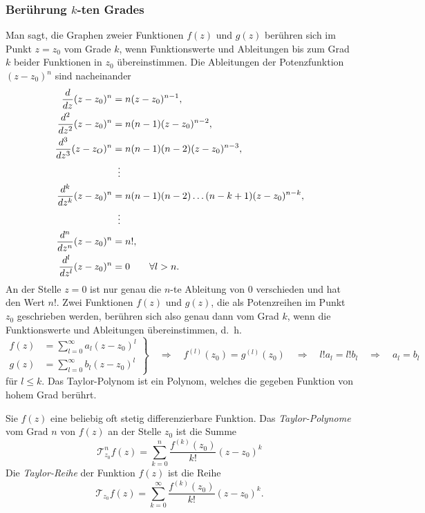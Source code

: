 %
%
\subsubsection{Berührung $k$-ten Grades}
Man sagt, die Graphen zweier Funktionen $f(z)$ und $g(z)$ berühren
sich im Punkt $z=z_0$ vom Grade $k$, wenn Funktionswerte und
Ableitungen bis zum Grad $k$ beider Funktionen in $z_0$ übereinstimmen.
Die Ableitungen der Potenzfunktion $(z-z_0)^n$ sind nacheinander
\begin{align*}
\frac{d}{dz}(z-z_0)^n&= n(z-z_0)^{n-1},
\\
\frac{d^2}{dz^2}(z-z_0)^n&=n(n-1)(z-z_0)^{n-2},
\\
\frac{d^3}{dz^3}(z-z_O)^n&=n(n-1)(n-2)(z-z_0)^{n-3},
\\
&\hspace*{2mm}\vdots
\\
\frac{d^k}{dz^k}(z-z_0)^n&=n(n-1)(n-2)\dots(n-k+1)(z-z_0)^{n-k},
\\
&\hspace*{2mm}\vdots
\\
\frac{d^n}{dz^n}(z-z_0)^n&=n!,
\\
\frac{d^l}{dz^l}(z-z_0)^n&=0\qquad\forall l>n.
\end{align*}
An der Stelle $z=0$ ist nur genau die $n$-te Ableitung von $0$ verschieden
und hat den Wert $n!$.
Zwei Funktionen $f(z)$ und $g(z)$, die als Potenzreihen im Punkt $z_0$
geschrieben werden, berühren sich also genau dann vom Grad $k$, wenn
die Funktionswerte und Ableitungen übereinstimmen, d.~h.
\begin{equation}
\left.
\begin{aligned}
f(z)&=\sum_{l=0}^\infty a_l(z-z_0)^l \\
g(z)&=\sum_{l=0}^\infty b_l(z-z_0)^l 
\end{aligned}
\right\}
\quad\Rightarrow\quad
f^{(l)}(z_0) = g^{(l)}(z_0)
\quad\Rightarrow\quad
l!a_l = l!b_l
\quad\Rightarrow\quad
a_l=b_l
\end{equation}
für $l\le k$.
Das Taylor-Polynom ist ein Polynom, welches die gegeben Funktion
von hohem Grad berührt.

\begin{definition}
\label{buch:polynome:definition:taylor-reihe}
%
Sie $f(z)$ eine beliebig oft stetig differenzierbare Funktion.
Das {\em Taylor-Polynome} vom Grad $n$ von $f(z)$ an der Stelle
$z_0$ ist die Summe
\begin{equation}
\mathscr{T}_{z_0}^nf (z)
=
\sum_{k=0}^n
\frac{f^{(k)}(z_0)}{k!} (z-z_0)^k
\label{buch:polynome:eqn:taylor-polynom}
\end{equation}
%
Die {\em Taylor-Reihe} der Funktion $f(z)$ ist die Reihe
\begin{equation}
\mathscr{T}_{z_0}f (z)
=
\sum_{k=0}^\infty
\frac{f^{(k)}(z_0)}{k!} (z-z_0)^k.
\label{buch:polynome:eqn:taylor-reihe}
\end{equation}
\end{definition}

